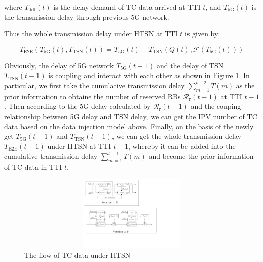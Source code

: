 \documentclass{SCIS2021}
\begin{document}
	\vspace{-6pt}
	\noindent where $T_\text{ddl}(t)$ is the delay demand of TC data arrived at TTI $t$, and $T_\text{5G}(t)$ is the transmission delay through previous 5G network.



	\par Thus the whole transmission delay under HTSN at TTI $t$ is given by:

	\setlength\abovedisplayskip{-16pt}
	\begin{center}
		\begin{equation}
			T_\text{E2E}\left(T_\text{5G}(t), T_\text{TSN}(t)\right)=T_\text{5G}(t)+T_\text{TSN}\left(Q(t), \mathcal{F}\left(T_\text{5G}(t)\right)\right)
		\end{equation}
	\end{center}
	\setlength\belowdisplayskip{-8pt}

	\vspace{-6pt}
	\par {\color{blue}Obviously, the delay of 5G network $T_\text{5G}(t-1)$ and the delay of TSN $T_\text{TSN}(t-1)$ is coupling and interact with each other as shown in Figure \ref{fig:flow}. In particular, we first take the cumulative transmission delay $\sum_{m=1}^{t-2} T(m)$ as the prior information to obtaine the number of reserved RBs $\mathcal{R}_{\mathrm{r}}(t-1)$ at TTI $t-1$. Then according to the 5G delay calculated by $\mathcal{R}_{\mathrm{r}}(t-1)$ and the couping relationship between 5G delay and TSN delay, we can get the IPV number of TC data based on the data injection model above. Finally, on the basis of the newly get $T_\text{5G}(t-1)$ and $T_\text{TSN}(t-1)$, we can get the whole transmission delay $T_\text{E2E}(t-1)$ under HTSN at TTI $t-1$, whereby it can be added into the cumulative transmission delay $\sum_{m=1}^{t-1} T(m)$ and become the prior information of TC data in TTI $t$.}

	\begin{figure}[h]
		\centering
		\includegraphics[height=3.6cm, width=15.5cm]{flow}
		\caption{The flow of TC data under HTSN}
		\label{fig:flow}
	\end{figure}
\end{document}
